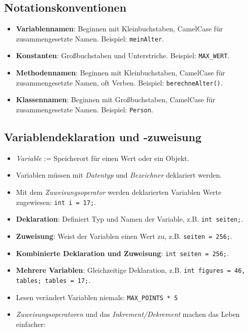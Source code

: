 \documentclass[a4paper,10pt, dvipsnames]{report}
\newcommand{\javaInLine}[1]{\texttt{#1}}
\begin{document}
\subsection{Notationskonventionen}

\begin{itemize}
    \item \textbf{Variablennamen}: Beginnen mit Kleinbuchstaben, CamelCase für zusammengesetzte Namen. Beispiel: \javaInLine{meinAlter}.
    \item \textbf{Konstanten}: Großbuchstaben und Unterstriche. Beispiel: \javaInLine{MAX_WERT}.
    \item \textbf{Methodennamen}: Beginnen mit Kleinbuchstaben, CamelCase für zusammengesetzte Namen, oft Verben. Beispiel: \javaInLine{berechneAlter()}.
    \item \textbf{Klassennamen}: Beginnen mit Großbuchstaben, CamelCase für zusammengesetzte Namen. Beispiel: \javaInLine{Person}.
\end{itemize}



\subsection{Variablendeklaration und -zuweisung}

\begin{itemize}
    \item \textit{Variable} := Speicherort für einen Wert oder ein Objekt.
    \item Variablen müssen mit \textit{Datentyp} und \textit{Bezeichner} deklariert werden.
    \item Mit dem \textit{Zuweisungsoperator} werden deklarierten Variablen Werte zugewiesen: \javaInLine{int i = 17;}.
    \item \textbf{Deklaration}: Definiert Typ und Namen der Variable, z.B. \javaInLine{int seiten;}.
    \item \textbf{Zuweisung}: Weist der Variablen einen Wert zu, z.B. \javaInLine{seiten = 256;}.
    \item \textbf{Kombinierte Deklaration und Zuweisung}: \javaInLine{int seiten = 256;}.
    \item \textbf{Mehrere Variablen}: Gleichzeitige Deklaration, z.B. \javaInLine{int figures = 46, tables; tables = 17;}.
\end{itemize}

\begin{itemize}
	\item Lesen verändert Variablen niemals: \javaInLine{MAX\_POINTS * 5}
	\item \textit{Zuweisungsoperatoren} und das \textit{Inkrement/Dekrement} machen das Leben einfacher:
\end{itemize}
\end{document}
